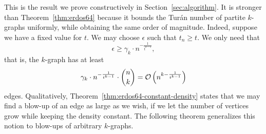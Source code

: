 This is the result we prove constructively in Section~\ref{sec:algorithm}.
It is stronger than Theorem~\ref{thm:erdos64}
because it bounds the Turán number of partite $k$-graphs uniformly,
while obtaining the same order of magnitude.
Indeed, suppose we have a fixed value for $t$.
We may choose $\epsilon$ such that $t_n \geq t$.
We only need that
\[
    \epsilon \geq \gamma_k \cdot n^{-\frac{1}{t^{k-1}}},
\]
that is, the $k$-graph has at least
\[
    \gamma_k \cdot n^{-\frac{1}{t^{k-1}}} \cdot \binom{n}{k} = \mathcal{O}\left(n^{k - \frac{1}{t^{k-1}}}\right)
\]
edges.
Qualitatively, Theorem~\ref{thm:erdos64-constant-density} states that
we may find a blow-up of an edge as large as we wish, if we let the number of vertices grow
while keeping the density constant.
The following theorem generalizes this notion to blow-ups of arbitrary $k$-graphs.

